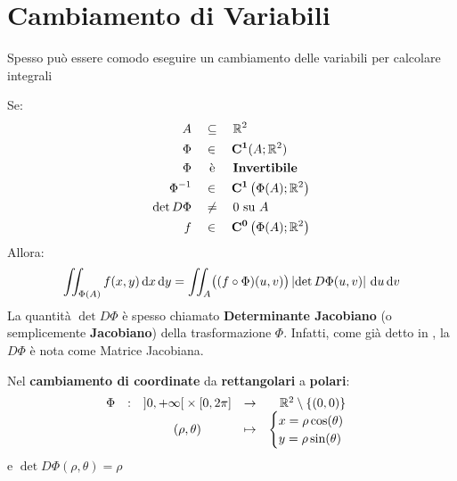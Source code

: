 \section{Cambiamento di Variabili}
Spesso può essere comodo eseguire un cambiamento delle variabili per calcolare integrali
\begin{proposition}
	Se:
	\begin{align*}
		A \quad &\subseteq \quad \mathbb{R}^2\\
		\Phi \quad &\in \quad \mathbf{C^{1}}(A; \mathbb{R}^2)\\
		\Phi  \quad &\;\,\text{è} \quad \;\,\text{\textbf{Invertibile}}\\
		\Phi^{-1}  \quad &\in \quad \mathbf{C^{1}}\left( \Phi(A);\mathbb{R}^2 \right)\\
		\det D\Phi \quad &\neq \quad 0 \text{ su } A\\
		f \quad &\in \quad \mathbf{C^{0}}\left( \Phi(A);\mathbb{R}^2 \right)
	\end{align*}
	Allora:
	\[ \iint_{\Phi(A)} f(x,y) \,\mathrm{d}{x} \,\mathrm{d}{y} = \iint_A \bigl( (f \circ \Phi)(u,v) \bigr) \left|\det D\Phi(u,v)\right| \,\mathrm{d}{u}\,\mathrm{d}{v}\]
	La quantità $\det D\Phi$ è spesso chiamato \textbf{Determinante Jacobiano} (o semplicemente \textbf{Jacobiano}) della trasformazione $\Phi$. Infatti, come già detto in , la $D\Phi$ è nota come Matrice Jacobiana.
\end{proposition}
\begin{observation}
	Nel \textbf{cambiamento di coordinate} da \textbf{rettangolari} a \textbf{polari}:
	\[
		\begin{array}{ccccc} {
			\Phi
		} & : & {
			\left]0,+ \infty\right[ \times \left[0,2 \pi\right]
		} & \to & {
			\mathbb{R}^2 \setminus \left\{(0,0)\right\}
		} \\ & & {
			(\rho, \theta)
		} & \mapsto & {
			\begin{cases}
				x = \rho \cos(\theta)\\
				y = \rho \sin(\theta)
			\end{cases}
		} \\ \end{array}
	\]
	e $\det D\Phi(\rho, \theta) = \rho$
\end{observation}
